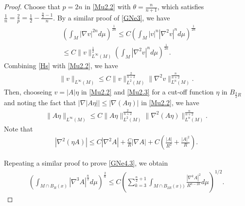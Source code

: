 \documentclass{amsart}
\theoremstyle{definition}
\numberwithin{equation}{section}
\begin{document}
\begin{proof}
Choose that $p=2n$ in  \eqref{Mu2.2} with $\theta=\frac n{n+1}$, which satisfies
$
\frac 1 n=\frac 2 p=\frac 1 2 -\frac {\frac n 2 -1} n$.
By a similar proof of \eqref{GNe3}, we have
\begin{align}\label{Hs}
&\left (\int_M  |\nabla   v|^{2n}  d\mu\right )^{\frac 1{2n}} \leq C\left ( \int_M  |v|^{n}  |\nabla^2 v|^{n}  d\mu \right )^{\frac 1{2n}}\\
&\leq C \|v\|^{\frac 12} _{L^{\infty}(M)}\left (  \int_M    |\nabla^2 v|^{n}  d\mu \right )^{\frac 1{2n}}\nonumber .
\end{align}
 Combining \eqref{Hs} with \eqref{Mu2.2}, we have
\begin{align}\label{Mu2.3}
 \|v\|_{L^{\infty}(M)}\leq C \| v\|^{\frac 2 {n+2} }_{L^2(M)}\|\nabla^{2} v\|^{\frac n {n+2}}_{L^n(M)}.
\end{align}
Then,   chooseing $v=|A| \eta $ in \eqref {Mu2.2} and \eqref{Mu2.3} for a cut-off function $ \eta $ in $B_{\frac 32 R}$ and
noting the fact that $|\nabla |A \eta||\leq |\nabla (A\eta)|$ in \eqref{Mu2.2}, we have
\begin{align}\label{Mu2.3.12}
 \|A  \eta\|_{L^{\infty}(M)}\leq C \| A \eta\|^{\frac 2 {n+2} }_{L^2(M)}\|\nabla^{2}  (A\eta)\|^{\frac n {n+2}}_{L^n(M)}.
\end{align}
Note that
\begin{align}\label{Mu2.3.1}
|\nabla^2(\eta A)|\leq C|\nabla^2A| +\frac C R|\nabla A |+C\left (\frac {|A|}{R^2} +\frac {|A|^2}R\right ).
\end{align}

 Repeating   a similar proof  to prove \eqref{GNe4.3},  we obtain
\begin{align}\label{BL1}
\left (\int_{ M \cap B_{R}(x)}  |\nabla^3  A|^{\frac n 2}  d\mu\right )^{\frac 2n}\leq C\left (\sum_{k=3}^{\frac n 2 +1} \int_{M \cap B_{2R}(x))}
\frac { |\nabla^{k}  A|^2 }{R^{ n-2k}} d\mu\right )^{1/2}.
\end{align}


\end{proof}
\end{document}
